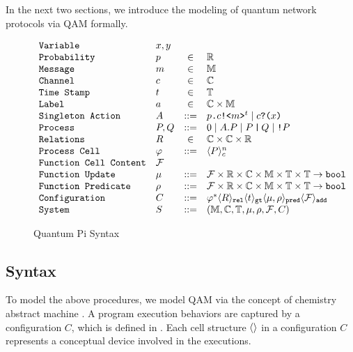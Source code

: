 In the next two sections, we introduce the modeling of quantum network protocols via QAM formally.

\begin{figure}[t]
{\small
  \[\begin{array}{llcl} 
      \texttt{Variable} & x,y \\
      \texttt{Probability} & p &\in &\mathbb{R}\\
      \texttt{Message} & m &\in& \mathbb{M}\\
    \texttt{Channel} & c &\in& \mathbb{C}\\
    \texttt{Time Stamp} & t &\in& \mathbb{T}\\
    \texttt{Label} & a &\in& \mathbb{C} \times \mathbb{M}\\
      \texttt{Singleton Action} & A & ::= & p\texttt{.}c\texttt{!<}m\texttt{>}^t \mid c\texttt{?(}x\texttt{)} \\
      \texttt{Process} & P,Q & ::= & 0 \mid A.P \mid P\,\texttt{|}\,Q \mid \texttt{!}P \\
      \texttt{Relations} & R & \in & \mathbb{C} \times \mathbb{C} \times \mathbb{R} \\
      \texttt{Process Cell} & \varphi & ::= & \langle P \rangle^{n}_{c} \\
      \texttt{Function Cell Content} & \mathcal{F} \\
      \texttt{Function Update} & \mu & ::= & \mathcal{F} \times \mathbb{R} \times \mathbb{C} \times \mathbb{M} \times \mathbb{T} \times \mathbb{T} \to \texttt{bool}\\
      \texttt{Function Predicate} & \rho & ::= & \mathcal{F} \times \mathbb{R} \times \mathbb{C} \times \mathbb{M} \times \mathbb{T} \times \mathbb{T} \to \texttt{bool}\\
      \texttt{Configuration} & C & ::= & \varphi^* \langle R \rangle_{\texttt{rel}} \langle t \rangle_{\texttt{gt}} 
                                           \langle \mu,\rho \rangle_{\texttt{pred}}\langle \mathcal{F} \rangle_{\texttt{add}} \\
      \texttt{System} & S & ::= & (\mathbb{M},\mathbb{C},\mathbb{T},\mu,\rho,\mathcal{F},C)
    \end{array}
  \]
}
\caption{Quantum Pi Syntax}
  \label{fig:q-pi-syntax}
\end{figure}


\subsection{Syntax} \label{sec:qamsyntax}

To model the above procedures, we model QAM via the concept of chemistry abstract machine \cite{BERRY1992217}.
A program execution behaviors are captured by a configuration $C$, which is defined in .
Each cell structure $\langle  \rangle$ in a configuration $C$ represents a conceptual device involved in the executions.

